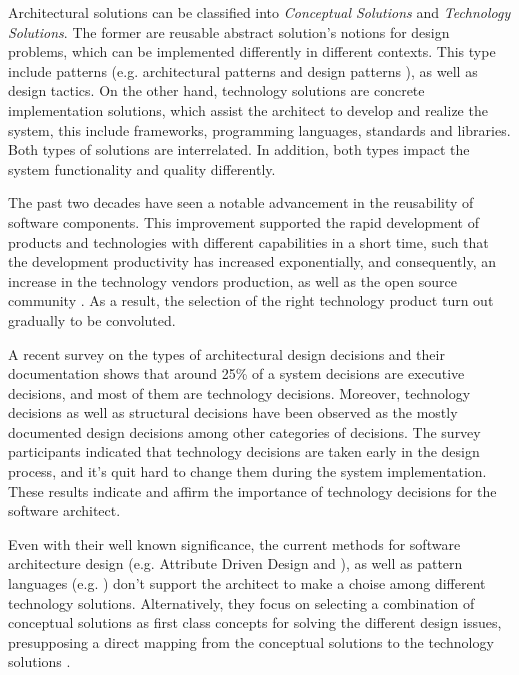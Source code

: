 \documentclass[conference]{IEEEtran}
\begin{document}
Architectural solutions can be classified into \textit{Conceptual Solutions} and
\textit{Technology Solutions}. The former are reusable abstract solution's
notions for design problems, which can be implemented differently in different contexts. This type include
patterns (e.g. architectural patterns \cite{Buschmann1996} and design patterns
\cite{Gamma1994}), as well as design tactics\cite{BassBook2012}.
On the other hand, technology solutions are concrete implementation solutions, 
which assist the architect to develop and realize the system, this include
frameworks, programming languages, standards and libraries. 
Both types of solutions are interrelated. In addition, both types impact the system 
functionality and quality differently.

The past two decades have seen a notable advancement in the reusability of
software components. This improvement supported the rapid development of
products and technologies with different capabilities in a short time, such that
the development productivity has increased exponentially, and
consequently, an increase in the technology vendors production, as well as the
open source community \cite{Boehm2006}. As a result, the
selection of the right technology product turn out gradually to be convoluted.

A recent survey \cite{Weinreich2013} on the types of architectural design
decisions and their documentation shows that around 25\% of a system decisions
are executive decisions, and most of them are technology decisions. Moreover,
technology decisions as well as structural decisions have been observed as the
mostly documented design decisions among other categories of decisions. The
survey participants indicated that technology decisions are taken early in the
design process, and it's quit hard to change them during the system
implementation. These results indicate and affirm the importance of technology
decisions for the software architect.

Even with their well known significance, the current methods for software 
architecture design (e.g. Attribute Driven Design \cite{Bass2003} and 
\cite{Bosch2000}), as well as pattern languages (e.g.
\cite{Avgeriou2005}) don't support the architect to make a choise among
different technology solutions. Alternatively, they focus on selecting a
combination of conceptual solutions as first class concepts for solving the
different design issues, presupposing a direct mapping from the conceptual
solutions to the technology solutions \cite{Kazman2013}.
\end{document}
